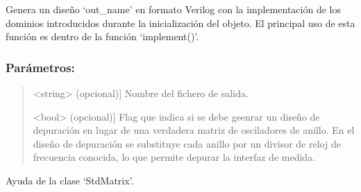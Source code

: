 \documentclass[letterpaper,10pt,english]{sphinxmanual}
\begin{document}
\begin{fulllineitems}
\begin{quote}
\begin{description}
\end{description}
\end{quote}

\begin{fulllineitems}
\label{\detokenize{myfpga:myfpga.ring_osc.StdMatrix.gen_romatrix}}
\pysigstartsignatures
{}
\pysigstopsignatures
\sphinxAtStartPar
Genera un diseño ‘out\_name’ en formato Verilog con la implementación de 
los dominios introducidos durante la inicialización del objeto. El 
principal uso de esta función es dentro de la función ‘implement()’.


\subsubsection{Parámetros:}
\label{\detokenize{myfpga:id4}}\begin{quote}
\begin{description}
\sphinxlineitem{out\_name}{[}\textless{}string\textgreater{} (opcional){]}
\sphinxAtStartPar
Nombre del fichero de salida.

\sphinxlineitem{debug}{[}\textless{}bool\textgreater{} (opcional){]}
\sphinxAtStartPar
Flag que indica si se debe geenrar un diseño de depuración en 
lugar de una verdadera matriz de osciladores de anillo. En el 
diseño de depuración se substituye cada anillo por un divisor de
reloj de frecuencia conocida, lo que permite depurar la interfaz
de medida.

\end{description}
\end{quote}

\end{fulllineitems}


\begin{fulllineitems}
\label{\detokenize{myfpga:myfpga.ring_osc.StdMatrix.help}}
\pysigstartsignatures
{}
\pysigstopsignatures
\sphinxAtStartPar
Ayuda de la clase ‘StdMatrix’.


\end{fulllineitems}
\end{fulllineitems}
\end{document}
